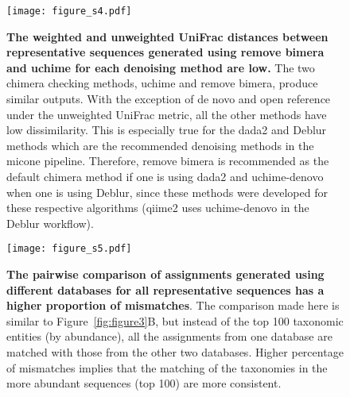     \begin{figure}[H]
      \centering
      \texttt{[image: figure\_s4.pdf]}
    \end{figure}
    \begin{figure}[H]
      \centering
        \caption{
          \textbf{The weighted and unweighted UniFrac distances between representative sequences generated using remove bimera and uchime for each denoising method are low.}
          The two chimera checking methods, uchime and remove bimera, produce similar outputs.
          With the exception of de novo and open reference under the unweighted UniFrac metric, all the other methods have low dissimilarity.
          This is especially true for the \ac{dada2} and Deblur methods which are the recommended denoising methods in the \ac{micone} pipeline.
          Therefore, remove bimera is recommended as the default chimera method if one is using \ac{dada2} and uchime-denovo when one is using Deblur, since these methods were developed for these respective algorithms (\ac{qiime2} uses uchime-denovo in the Deblur workflow).
        }
      \label{fig:figure_s4}
    \end{figure}
    \FloatBarrier
    \newpage

    \begin{figure}[H]
      \centering
      \texttt{[image: figure\_s5.pdf]}
    \end{figure}
    \begin{figure}[H]
      \centering
        \caption{
          \textbf{The pairwise comparison of assignments generated using different databases for all representative sequences has a higher proportion of mismatches}.
          The comparison made here is similar to Figure~\ref{fig:figure3}B, but instead of the top 100 taxonomic entities (by abundance), all the assignments from one database are matched with those from the other two databases.
          Higher percentage of mismatches implies that the matching of the taxonomies in the more abundant sequences (top 100) are more consistent.
        }
      \label{fig:figure_s5}
    \end{figure}
    \FloatBarrier
    \newpage

